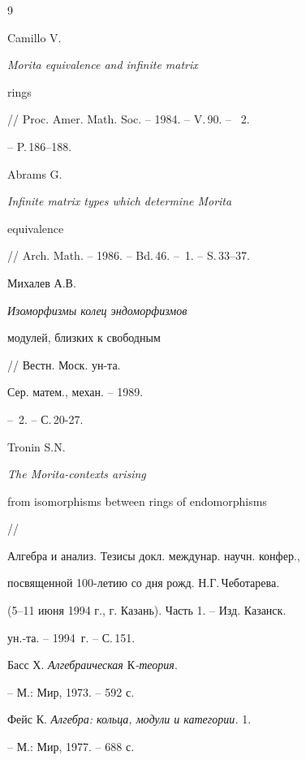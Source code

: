 \begin{thebibliography}{9}







Camillo V. {\em Morita equivalence and infinite matrix


rings} // Proc. Amer. Math. Soc. -- 1984. -- V.\,90. -- \No\, 2.


-- P.\,186--188.







Abrams G. {\em Infinite matrix types which determine Morita


equivalence} // Arch. Math. -- 1986. -- Bd.\,46. -- \No\,1. -- S.\,33--37.







Михалев А.В. {\em Изоморфизмы колец эндоморфизмов


модулей, близких к свободным} // Вестн. Моск. ун-та.


Сер. матем., механ. -- 1989.


-- \No\,2. -- С.\,20-27.







Tronin S.N. {\em The Morita-contexts arising


from isomorphisms between rings of endomorphisms} //


Алгебра и анализ. Тезисы докл. междунар. научн. конфер.,


посвященной 100-летию со дня рожд. Н.Г.\,Чеботарева.


(5--11 июня 1994 г., г. Казань). Часть 1. -- Изд. Казанск.


ун.-та. -- 1994~г. -- С.\,151.





 Басс Х. {\em Алгебраическая $К$-теория}.


-- М.: Мир, 1973. -- 592 с.







Фейс К. {\em Алгебра: кольца, модули и категории.} 1.


-- М.: Мир, 1977. -- 688 с.






\end{thebibliography}
